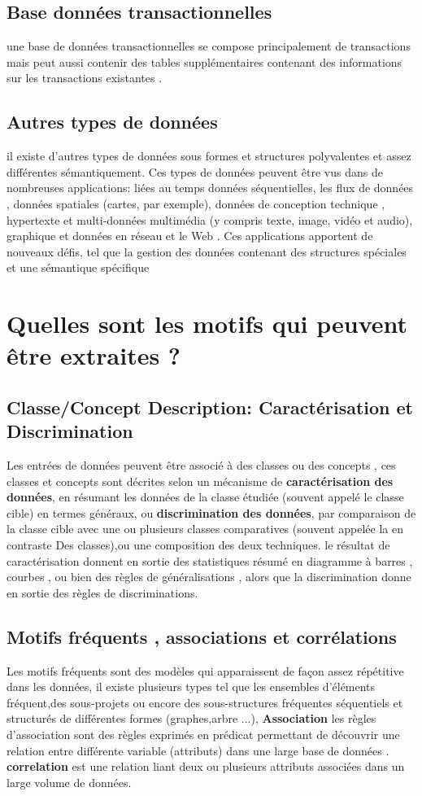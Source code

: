 \documentclass[12pt,a4paper,oneside]{book}
\begin{document}
\subsection{Base données transactionnelles }
une base de données transactionnelles se compose principalement de transactions mais peut aussi contenir des tables supplémentaires contenant des informations sur les transactions existantes .
\subsection{Autres types de données}
il existe d'autres types de données
sous formes et  structures polyvalentes et assez différentes
sémantiquement. Ces types de données peuvent être vus dans de nombreuses applications: liées au temps
données séquentielles,
les flux de données , données spatiales (cartes, par exemple), données de conception technique , hypertexte et multi-données multimédia (y compris texte, image, vidéo et audio), graphique et données en réseau
et le Web . Ces applications apportent de nouveaux
défis, tel que la gestion des données contenant des structures spéciales et une sémantique spécifique
\section{Quelles sont les motifs qui peuvent être extraites ?}
\subsection{Classe/Concept Description: Caractérisation
	et Discrimination}
Les entrées de données peuvent être associé à des classes ou des concepts , ces classes et concepts sont décrites selon un mécanisme 
de \textbf{caractérisation des données}, en résumant les données de la classe étudiée (souvent appelé le classe cible) en termes généraux, ou \textbf{discrimination des données}, par comparaison de la classe  cible avec une ou plusieurs classes comparatives (souvent appelée la en contraste Des classes),ou une composition des deux techniques. 
le résultat de caractérisation donnent en sortie des statistiques résumé en diagramme à barres
,
courbes , ou bien des règles de généralisations , alors que la discrimination donne en sortie des règles de discriminations.
\subsection{Motifs fréquents , associations et corrélations} 
Les motifs fréquents sont des modèles qui apparaissent de façon assez répétitive dans les données, il existe plusieurs types tel que  les ensembles d'éléments fréquent,des sous-projets ou encore des sous-structures fréquentes séquentiels et structurés  de différentes formes  (graphes,arbre ...),    
\textbf{Association}
les règles d’association sont des règles exprimés  en prédicat permettant de découvrir une relation entre différente variable (attributs) dans une large base de données . \\
\textbf{correlation } est une relation  liant deux ou plusieurs attributs associées dans un large volume de données.
\end{document}
